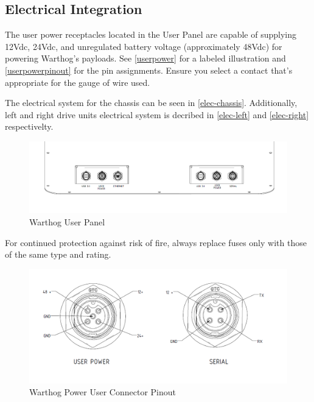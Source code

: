 \documentclass[]{clearpath-latex/clearpath-manual}
\begin{document}
\pagebreak[4]
\subsection{Electrical Integration}
\label{electrical}

The user power receptacles located in the User Panel are capable of supplying 12Vdc, 24Vdc, and unregulated battery voltage (approximately 48Vdc) for powering Warthog's payloads. See \autoref{userpower} for a labeled illustration and \autoref{userpowerpinout} for the pin assignments. Ensure you select a contact that's appropriate for the gauge of wire used.

The electrical system for the chassis can be seen in \autoref{elec-chassis}. Additionally, left and right drive units electrical system is decribed in \autoref{elec-left} and \autoref{elec-right} respectivelty.





\begin{figure}[!h]
  \centering
  \includegraphics[width=1.0\linewidth]{graphics/User_Panel_Labeled.png}
  \caption{Warthog User Panel}
  \label{userpower}
\end{figure}


\begin{warning}
For continued protection against risk of fire, always replace fuses only with those of the same type and rating.
\end{warning}


\begin{figure}[!htb]
  \centering
  \includegraphics[width=1.0\linewidth]{graphics/Breakout_pinouts.png}
  \caption{Warthog Power User Connector Pinout}
  \label{userpowerpinout}
\end{figure}
\end{document}
